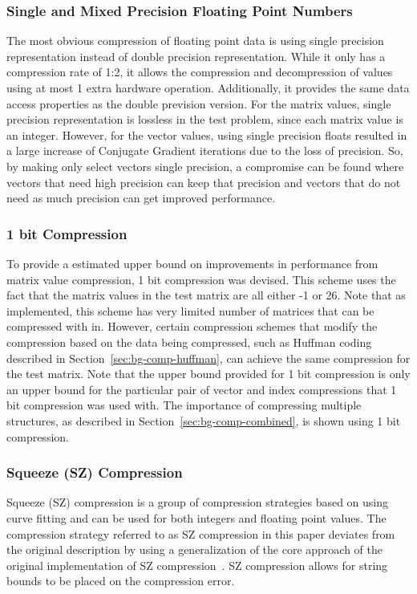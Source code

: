 \subsubsection{Single and Mixed Precision Floating Point Numbers}
The most obvious compression of floating point data is using single precision representation instead of double precision representation.
While it only has a compression rate of 1:2, it allows the compression and decompression of values using at most 1 extra hardware operation.
Additionally, it provides the same data access properties as the double prevision version.
For the matrix values, single precision representation is lossless in the test problem, since each matrix value is an integer.
However, for the vector values, using single precision floats resulted in a large increase of Conjugate Gradient iterations due to the loss of precision.
So, by making only select vectors single precision, a compromise can be found where vectors that need high precision can keep that precision and vectors that do not need as much precision can get improved performance.

\subsubsection{1 bit Compression}
\label{sec:bg-comp-1bit}
To provide a estimated upper bound on improvements in performance from matrix value compression, 1 bit compression was devised.
This scheme uses the fact that the matrix values in the test matrix are all either -1 or 26.
Note that as implemented, this scheme has very limited number of matrices that can be compressed with in.
However, certain compression schemes that modify the compression based on the data being compressed, such as Huffman coding described in Section~\ref{sec:bg-comp-huffman}, can achieve the same compression for the test matrix.
Note that the upper bound provided for 1 bit compression is only an upper bound for the particular pair of vector and index compressions that 1 bit compression was used with.
The importance of compressing multiple structures, as described in Section~\ref{sec:bg-comp-combined}, is shown using 1 bit compression.

\subsubsection{Squeeze (SZ) Compression}
Squeeze (SZ) compression is a group of compression strategies based on using curve fitting and can be used for both integers and floating point values.
The compression strategy referred to as SZ compression in this paper deviates from the original description by using a generalization of the core approach of the original implementation of SZ compression~\cite{Di:2016:SZ}.
SZ compression allows for string bounds to be placed on the compression error.

